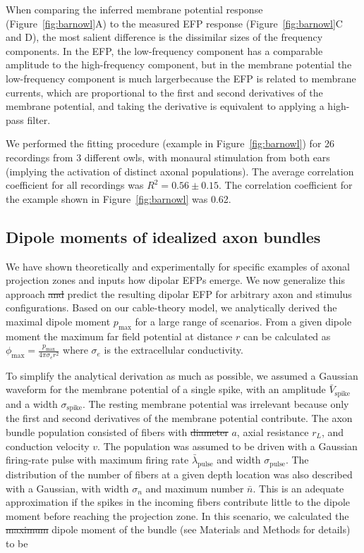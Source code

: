 \documentclass[]{article}
\providecommand{\DIFaddtex}[1]{{\protect\color{blue}\uwave{#1}}} %
\providecommand{\DIFdeltex}[1]{{\protect\color{red}\sout{#1}}}                      %
\providecommand{\DIFaddbegin}{} %
\providecommand{\DIFaddend}{} %
\providecommand{\DIFdelbegin}{} %
\providecommand{\DIFdelend}{} %
\providecommand{\DIFadd}[1]{\texorpdfstring{\DIFaddtex{#1}}{#1}} %
\providecommand{\DIFdel}[1]{\texorpdfstring{\DIFdeltex{#1}}{}} %
\begin{document}
When comparing the inferred membrane potential response
(Figure~\ref{fig:barnowl}A) to the measured EFP response
(Figure~\ref{fig:barnowl}C and D), the most salient difference is the
dissimilar sizes of the frequency components. In the EFP, the
low-frequency component has a comparable amplitude to the high-frequency
component, but in the membrane potential the low-frequency component is
much larger\DIFaddbegin \DIFadd{. This is }\DIFaddend because the EFP is related to membrane currents,
which are proportional to the first and second derivatives of the
membrane potential, and taking the derivative is equivalent to applying
a high-pass filter.

We performed the fitting procedure (example in Figure~\ref{fig:barnowl})
for 26 recordings from 3 different owls, with monaural stimulation from
both ears (implying the activation of distinct axonal populations). The
average correlation coefficient for all recordings was
\(R^2=0.56\pm 0.15\). The correlation coefficient for the example shown
in Figure~\ref{fig:barnowl} was 0.62.

\subsection{Dipole moments of idealized axon
bundles}\label{dipole-moments-of-idealized-axon-bundles}

We have shown theoretically and experimentally for specific examples of
axonal projection zones and inputs how dipolar EFPs emerge. We now
generalize this approach \DIFdelbegin \DIFdel{and }\DIFdelend \DIFaddbegin \DIFadd{to }\DIFaddend predict the resulting dipolar EFP for
arbitrary axon and stimulus configurations. Based on our cable-theory
model, we analytically derived the maximal dipole moment
\(p_\text{max}\) for a large range of scenarios. From a given dipole
moment the maximum far field potential at distance \(r\) can be
calculated as \(\phi_\text{max}=\frac{p_\text{max}}{4\pi \sigma_e r^2}\)
where \(\sigma_e\) is the extracellular conductivity.

To simplify the analytical derivation as much as possible, we assumed a
Gaussian waveform for the membrane potential of a single spike, with an
amplitude \(\bar{V}_{\text{spike}}\) and a width
\(\sigma_{\text{spike}}\). The resting membrane potential was irrelevant
because only the first and second derivatives of the membrane potential
contribute. The axon bundle population consisted of fibers with \DIFdelbegin \DIFdel{diameter
}\DIFdelend \DIFaddbegin \DIFadd{radius
}\DIFaddend \(a\), axial resistance \(r_L\), and conduction velocity \(v\). The
population was assumed to be driven with a Gaussian firing-rate pulse
with maximum firing rate \(\bar{\lambda}_{\text{pulse}}\) and width
\(\sigma_{\text{pulse}}\). The distribution of the number of fibers at a
given depth location was also described with a Gaussian, with width
\(\sigma_n\) and maximum number \(\bar{n}\). This is an adequate
approximation if the spikes in the incoming fibers contribute little to
the dipole moment before reaching the projection zone. In this scenario,
we calculated the \DIFdelbegin \DIFdel{maximum }\DIFdelend \DIFaddbegin \DIFadd{peak }\DIFaddend dipole moment of the bundle (see Materials and
Methods for details) to be
\end{document}
